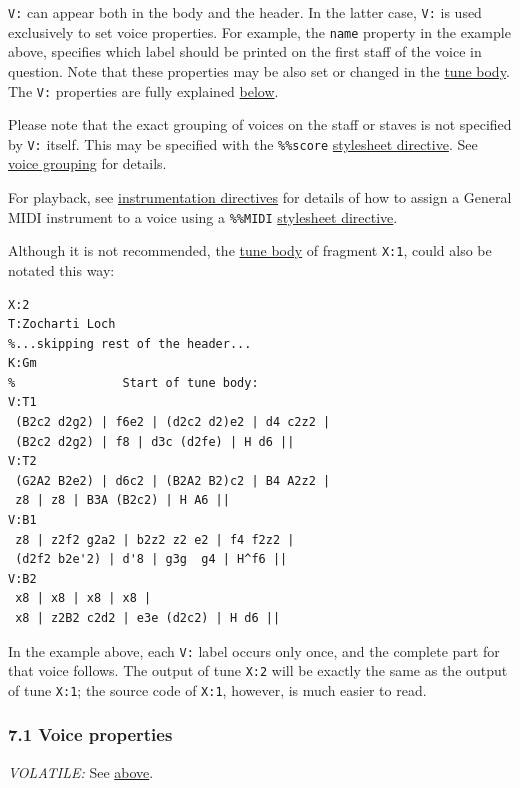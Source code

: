 \documentclass[oneside]{book}
\begin{document}
\texttt{V:} can appear both in the body and the header. In the latter
case, \texttt{V:} is used exclusively to set voice properties. For
example, the \texttt{name} property in the example above, specifies
which label should be printed on the first staff of the voice in
question. Note that these properties may be also set or changed in the
\protect\hyperlink{tune_body_definition}{tune body}. The \texttt{V:}
properties are fully explained
\protect\hyperlink{voice_properties}{below}.

Please note that the exact grouping of voices on the staff or staves is
not specified by \texttt{V:} itself. This may be specified with the
\texttt{\%\%score}
\protect\hyperlink{stylesheet_directive_definition}{stylesheet
directive}. See \protect\hyperlink{voice_grouping}{voice grouping} for
details.

For playback, see
\protect\hyperlink{instrumentation_directives}{instrumentation
directives} for details of how to assign a General MIDI instrument to a
voice using a \texttt{\%\%MIDI}
\protect\hyperlink{stylesheet_directive_definition}{stylesheet
directive}.

Although it is not recommended, the
\protect\hyperlink{tune_body_definition}{tune body} of fragment
\texttt{X:1}, could also be notated this way:

\begin{verbatim}
X:2
T:Zocharti Loch
%...skipping rest of the header...
K:Gm
%               Start of tune body:
V:T1
 (B2c2 d2g2) | f6e2 | (d2c2 d2)e2 | d4 c2z2 |
 (B2c2 d2g2) | f8 | d3c (d2fe) | H d6 ||
V:T2
 (G2A2 B2e2) | d6c2 | (B2A2 B2)c2 | B4 A2z2 |
 z8 | z8 | B3A (B2c2) | H A6 ||
V:B1
 z8 | z2f2 g2a2 | b2z2 z2 e2 | f4 f2z2 |
 (d2f2 b2e'2) | d'8 | g3g  g4 | H^f6 ||
V:B2
 x8 | x8 | x8 | x8 |
 x8 | z2B2 c2d2 | e3e (d2c2) | H d6 ||
\end{verbatim}

In the example above, each \texttt{V:} label occurs only once, and the
complete part for that voice follows. The output of tune \texttt{X:2}
will be exactly the same as the output of tune \texttt{X:1}; the source
code of \texttt{X:1}, however, is much easier to read.

\hypertarget{voice_properties}{\subsubsection{7.1 Voice
properties}\label{voice_properties}}

\emph{VOLATILE:} See \protect\hyperlink{multiple_voices}{above}.
\end{document}
